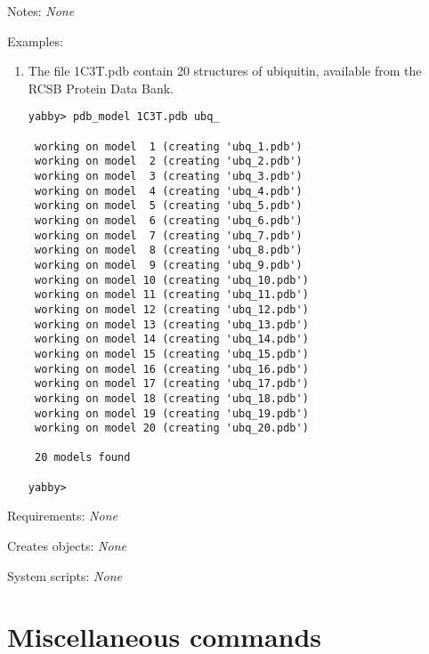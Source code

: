 \begin{description}

\item{Notes:} {\em None}


\item{Examples:}
\begin{enumerate}

\item The file 1C3T.pdb contain 20 structures of ubiquitin, available
from the RCSB Protein Data Bank.
\begin{verbatim}
yabby> pdb_model 1C3T.pdb ubq_

 working on model  1 (creating 'ubq_1.pdb')
 working on model  2 (creating 'ubq_2.pdb')
 working on model  3 (creating 'ubq_3.pdb')
 working on model  4 (creating 'ubq_4.pdb')
 working on model  5 (creating 'ubq_5.pdb')
 working on model  6 (creating 'ubq_6.pdb')
 working on model  7 (creating 'ubq_7.pdb')
 working on model  8 (creating 'ubq_8.pdb')
 working on model  9 (creating 'ubq_9.pdb')
 working on model 10 (creating 'ubq_10.pdb')
 working on model 11 (creating 'ubq_11.pdb')
 working on model 12 (creating 'ubq_12.pdb')
 working on model 13 (creating 'ubq_13.pdb')
 working on model 14 (creating 'ubq_14.pdb')
 working on model 15 (creating 'ubq_15.pdb')
 working on model 16 (creating 'ubq_16.pdb')
 working on model 17 (creating 'ubq_17.pdb')
 working on model 18 (creating 'ubq_18.pdb')
 working on model 19 (creating 'ubq_19.pdb')
 working on model 20 (creating 'ubq_20.pdb')

 20 models found

yabby>
\end{verbatim}

\end{enumerate}


\item{Requirements:} {\em None}


\item{Creates objects:} {\em None}


\item{System scripts:} {\em None}

\end{description}



\section{Miscellaneous commands}

